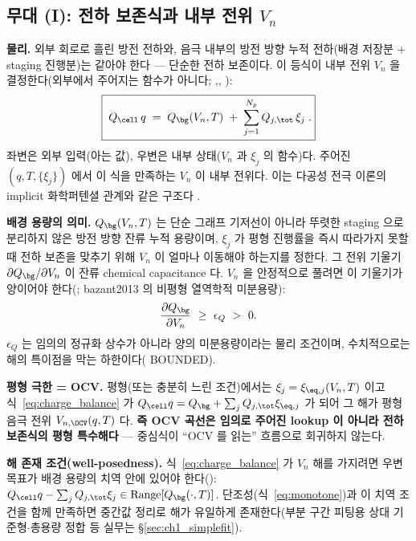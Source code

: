 \subsection{무대 (I): 전하 보존식과 내부 전위 $V_n$}\label{sec:charge}
\textbf{물리.} 외부 회로로 흘린 방전 전하와, 음극 내부의 방전 방향 누적 전하(배경 저장분 + staging 진행분)는
같아야 한다 — 단순한 전하 보존이다. 이 등식이 내부 전위 $V_n$ 을 결정한다(외부에서 주어지는 함수가
아니다; ,, \cite{doyle1993,newman}):
\begin{equation}
\boxed{\;Q_\cell\,q \;=\; Q_\bg(V_n,T) \;+\; \sum_{j=1}^{N_p} Q_{j,\tot}\,\xi_j\;.}
\label{eq:charge_balance}
\end{equation}
좌변은 외부 입력(아는 값), 우변은 내부 상태($V_n$ 과 $\xi_j$ 의 함수)다. 주어진 $(q,T,\{\xi_j\})$ 에서 이
식을 만족하는 $V_n$ 이 내부 전위다. 이는 다공성 전극 이론의 implicit 화학퍼텐셜 관계와 같은 구조다
\cite{doyle1993,newman}.

\textbf{배경 용량의 의미.} $Q_\bg(V_n,T)$ 는 단순 그래프 기저선이 아니라 뚜렷한 staging 으로 분리하지 않은
방전 방향 잔류 누적 용량이며, $\xi_j$ 가 평형 진행률을 즉시 따라가지 못할 때 전하 보존을 맞추기 위해 $V_n$
이 얼마나 이동해야 하는지를 정한다. 그 전위 기울기 $\partial Q_\bg/\partial V_n$ 이 잔류 chemical
capacitance 다. $V_n$ 을 안정적으로 풀려면 이 기울기가 양이어야 한다(; bazant2013 의 비평형
열역학적 미분용량):
\begin{equation}
\frac{\partial Q_\bg}{\partial V_n}\ \ge\ \epsilon_Q\ >\ 0 .
\label{eq:monotone}
\end{equation}
$\epsilon_Q$ 는 임의의 정규화 상수가 아니라 양의 미분용량이라는 물리 조건이며, 수치적으로는 해의 특이점을
막는 하한이다( BOUNDED).

\textbf{평형 극한 = OCV.} 평형(또는 충분히 느린 조건)에서는 $\xi_j=\xi_{\eq,j}(V_n,T)$ 이고
식~\eqref{eq:charge_balance} 가 $Q_\cell q=Q_\bg+\sum_j Q_{j,\tot}\xi_{\eq,j}$ 가 되어 그 해가 평형 음극
전위 $V_{n,\OCV}(q,T)$ 다. \textbf{즉 OCV 곡선은 임의로 주어진 lookup 이 아니라 전하 보존식의 평형
특수해다} — 중심식이 ``OCV 를 읽는'' 흐름으로 회귀하지 않는다.

\textbf{해 존재 조건(well-posedness).} 식~\eqref{eq:charge_balance} 가 $V_n$ 해를 가지려면 우변 목표가 배경
용량의 치역 안에 있어야 한다(): $Q_\cell q-\sum_j Q_{j,\tot}\xi_j\in\mathrm{Range}[Q_\bg(\cdot,T)]$.
단조성(식~\eqref{eq:monotone})과 이 치역 조건을 함께 만족하면 중간값 정리로 해가 유일하게 존재한다(부분
구간 피팅용 상대 기준형$\cdot$총용량 정합 등 실무는 \S\ref{sec:ch1_simplefit}).

